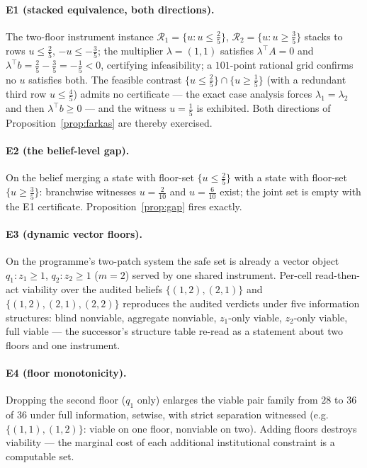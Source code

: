 \documentclass[10pt,twocolumn]{article}
\theoremstyle{definition}
\begin{document}
\paragraph{E1 (stacked equivalence, both directions).}
The two-floor instrument instance $\mathcal R_1=\{u: u\le\tfrac25\}$,
$\mathcal R_2=\{u: u\ge\tfrac35\}$ stacks to rows $u\le\tfrac25$,
$-u\le-\tfrac35$; the multiplier $\lambda=(1,1)$ satisfies
$\lambda^{\top}A=0$ and $\lambda^{\top}b=\tfrac25-\tfrac35=-\tfrac15<0$,
certifying infeasibility; a $101$-point rational grid confirms no $u$
satisfies both. The feasible contrast $\{u\le\tfrac25\}\cap\{u\ge\tfrac15\}$
(with a redundant third row $u\le\tfrac45$) admits no certificate --- the
exact case analysis forces $\lambda_1=\lambda_2$ and then
$\lambda^{\top}b\ge 0$ --- and the witness $u=\tfrac15$ is exhibited. Both
directions of Proposition~\ref{prop:farkas} are thereby exercised.

\paragraph{E2 (the belief-level gap).}
On the belief merging a state with floor-set $\{u\le\tfrac25\}$ with a
state with floor-set $\{u\ge\tfrac35\}$: branchwise witnesses $u=\tfrac2{10}$
and $u=\tfrac6{10}$ exist; the joint set is empty with the E1 certificate.
Proposition~\ref{prop:gap} fires exactly.

\paragraph{E3 (dynamic vector floors).}
On the programme's two-patch system the safe set is already a vector object
$q_1: z_1\ge 1$, $q_2: z_2\ge 1$ ($m=2$) served by one shared instrument.
Per-cell read-then-act viability over the audited beliefs
$\{(1,2),(2,1)\}$ and $\{(1,2),(2,1),(2,2)\}$ reproduces the audited
verdicts under five information structures: blind nonviable, aggregate
nonviable, $z_1$-only viable, $z_2$-only viable, full viable --- the
successor's structure table re-read as a statement about two floors and one
instrument.

\paragraph{E4 (floor monotonicity).}
Dropping the second floor ($q_1$ only) enlarges the viable pair family from
$28$ to $36$ of $36$ under full information, setwise, with strict
separation witnessed (e.g.\ $\{(1,1),(1,2)\}$: viable on one floor,
nonviable on two). Adding floors destroys viability --- the marginal cost of
each additional institutional constraint is a computable set.
\end{document}
